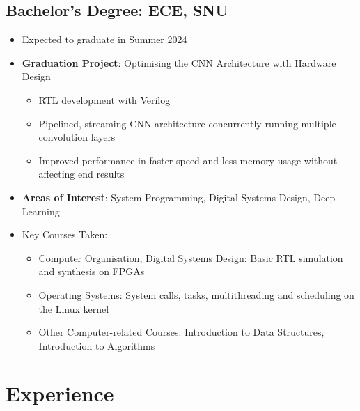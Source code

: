 \documentclass[10pt]{article}
\begin{document}
\subsection*{Bachelor's Degree: ECE, SNU}
\begin{itemize}
  \item Expected to graduate in Summer 2024
  \item \textbf{Graduation Project}: Optimising the CNN Architecture with
    Hardware Design \label{edu:gradproj}
    \begin{itemize}
      \item RTL development with Verilog
      \item Pipelined, streaming CNN architecture concurrently running multiple
        convolution layers
      \item Improved performance in faster speed and less memory usage without
        affecting end results
    \end{itemize}
  \item \textbf{Areas of Interest}: System Programming, Digital Systems Design,
    Deep Learning
  \item[ ] Key Courses Taken:
    \begin{itemize}
      \item Computer Organisation, Digital Systems Design: Basic RTL simulation
        and synthesis on FPGAs
      \item Operating Systems: System calls, tasks, multithreading and
        scheduling on the Linux kernel
      \item Other Computer-related Courses: Introduction to Data Structures,
        Introduction to Algorithms
    \end{itemize}
\end{itemize}

\section*{Experience}
\end{document}

